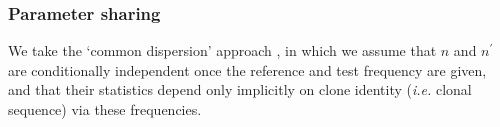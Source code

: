 \documentclass[letterpaper,english,prl,reprint,longbibliography]{revtex4-1} %
\begin{document}



\subsubsection*{Parameter sharing}
We take the `common dispersion' approach \citep{Robinson2008}, in which we assume that $n$ and $n^{\prime}$ are conditionally independent once the reference and test frequency are given, and that their statistics depend only implicitly on clone identity (\emph{i.e.} clonal sequence) via these frequencies.
\end{document}
